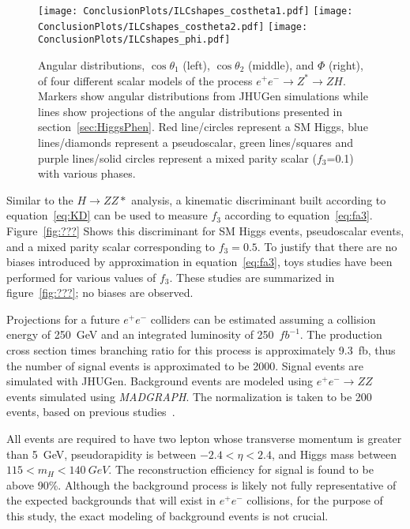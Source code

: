 \begin{figure}
\begin{center}
\texttt{[image: ConclusionPlots/ILCshapes\_costheta1.pdf]}
\texttt{[image: ConclusionPlots/ILCshapes\_costheta2.pdf]}
\texttt{[image: ConclusionPlots/ILCshapes\_phi.pdf]}
\label{fig:ILCprojections}
\caption{Angular distributions, $\cos\theta_1$ (left), 
$\cos\theta_2$ (middle), and $\Phi$ (right), of four different 
scalar models of the process $e^+e^-\to Z^*\to ZH$.  Markers
show angular distributions from JHUGen simulations while
lines show projections of the angular distributions presented
in section~\ref{sec:HiggsPhen}. Red line/circles represent a 
SM Higgs, blue lines/diamonds represent a pseudoscalar, green
lines/squares and purple lines/solid circles represent a 
mixed parity scalar ($f_3$=0.1) with various phases.}
\end{center}
\end{figure}

Similar to the $H\to ZZ*$ 
analysis, a kinematic discriminant built according to
equation~\ref{eq:KD} can be used to measure 
$f_3$ according to equation~\ref{eq:fa3}.  
Figure~\ref{fig:???} Shows this discriminant for SM Higgs
events, pseudoscalar events, and a mixed parity scalar
corresponding to $f_3=0.5$.  To justify that there are no
biases introduced by approximation in equation~\ref{eq:fa3},
toys studies have been performed for various values of 
$f_3$.  These studies are summarized in figure~\ref{fig:???};
no biases are observed.  

Projections for a future $e^+e^-$
colliders can be estimated assuming a collision energy  
of 250~GeV and an integrated luminosity of 250~$fb^{-1}$.
The production cross section times branching ratio for 
this process is approximately 9.3~fb, thus the number 
of signal events is approximated to be 2000.  Signal 
events are simulated with JHUGen.  Background events
are modeled using $e^+e^-\to ZZ$ events simulated using
{\it MADGRAPH}.  The normalization is taken to be 200 
events, based on previous studies~\cite{??}.  

All events are required to have two lepton whose 
transverse momentum is greater than 5~GeV,
pseudorapidity is between $-2.4<\eta<2.4$, and 
Higgs mass between $115<m_H<140~GeV$.  The reconstruction
efficiency for signal is found to be above 90\%. Although
the background process is likely not fully representative
of the expected backgrounds that will exist in $e^+e^-$
collisions, for the purpose of this study, the exact modeling 
of background events is not crucial.  

